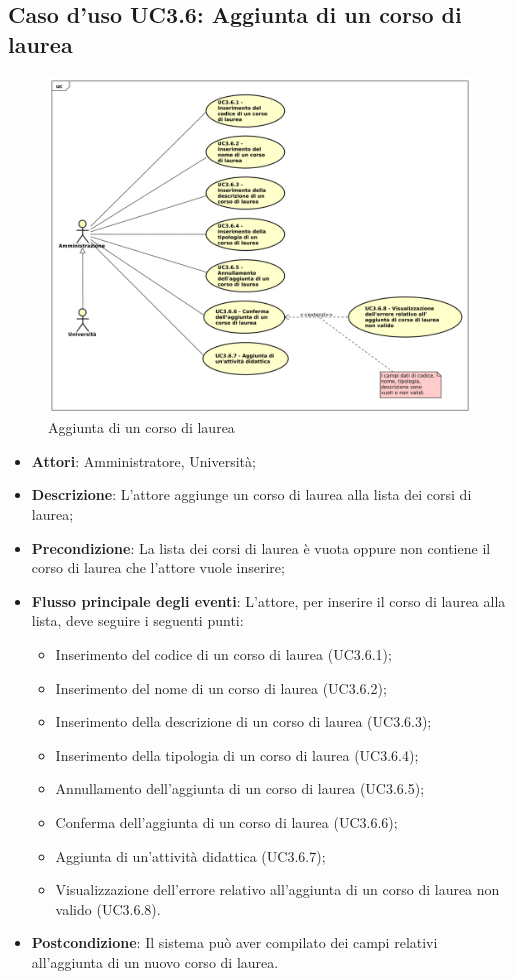 \subsection{Caso d'uso \texorpdfstring{UC3.6}{UC3.6}: Aggiunta di un corso di laurea}
\begin{figure} [H]
	\centering
	\includegraphics[scale=0.45]{./img/UC3-6.pdf}
	\caption{Aggiunta di un corso di laurea}\label{}
\end{figure}
\begin{itemize}
	\item \textbf{Attori}: Amministratore, Università;
	\item \textbf{Descrizione}: L'attore aggiunge un corso di laurea alla lista dei corsi di laurea;
	\item \textbf{Precondizione}: La lista dei corsi di laurea è vuota oppure non contiene il corso di laurea che l'attore vuole inserire;
	\item \textbf{Flusso principale degli eventi}: L'attore, per inserire il corso di laurea alla lista, deve seguire i seguenti punti:
	\begin{itemize}
		\item Inserimento del codice di un corso di laurea (UC3.6.1);
		\item Inserimento del nome di un corso di laurea (UC3.6.2);
		\item Inserimento della descrizione di un corso di laurea (UC3.6.3);
		\item Inserimento della tipologia di un corso di laurea (UC3.6.4);
		\item Annullamento dell'aggiunta di un corso di laurea (UC3.6.5);
		\item Conferma dell’aggiunta di un corso di laurea (UC3.6.6);
		\item Aggiunta di un'attività didattica (UC3.6.7);
		\item Visualizzazione dell'errore relativo all’aggiunta di un corso di laurea non valido (UC3.6.8).
	\end{itemize}
	\item \textbf{Postcondizione}: Il sistema può aver compilato dei campi relativi all'aggiunta di un nuovo corso di laurea.
\end{itemize}
